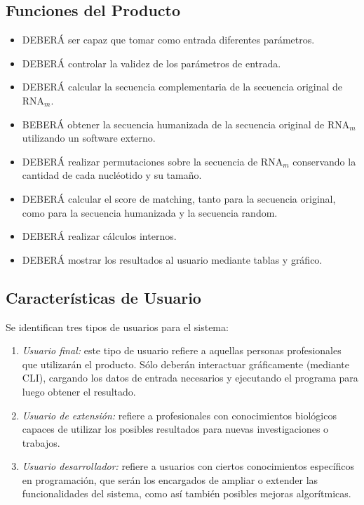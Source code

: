 \documentclass[12pt,a4paper,spanish]{article}
\begin{document}
\subsection{Funciones del Producto}
	\begin{itemize}
		\item DEBERÁ ser capaz que tomar como entrada diferentes parámetros. 
		\item DEBERÁ controlar la validez de los parámetros de entrada.
		\item DEBERÁ calcular la secuencia complementaria de la secuencia original de RNA$_m$.
		\item BEBERÁ obtener la secuencia humanizada de la secuencia original de RNA$_m$ utilizando un software externo.
		\item DEBERÁ realizar permutaciones sobre la secuencia de RNA$_m$ conservando la cantidad de cada nucléotido y su tamaño.
		\item DEBERÁ calcular el score de matching, tanto para la secuencia original, como para la secuencia humanizada y la secuencia random.
		\item DEBERÁ realizar cálculos internos.
		\item DEBERÁ mostrar los resultados al usuario mediante tablas y gráfico.		
	\end{itemize}

\subsection{Características de Usuario}
	Se identifican tres tipos de usuarios para el sistema:
	\begin{enumerate}
 		\item \textit{Usuario final:} este tipo de usuario refiere a aquellas personas profesionales que utilizarán el 										producto. Sólo deberán interactuar gráficamente (mediante CLI), cargando los datos de entrada 										necesarios y ejecutando el programa para luego obtener el resultado. 
		\item \textit{Usuario de extensión:} refiere a profesionales con conocimientos biológicos capaces de utilizar los 												posibles resultados para nuevas investigaciones o trabajos.
		\item \textit{Usuario desarrollador:} refiere a usuarios con ciertos conocimientos específicos en programación, 											que serán los encargados de ampliar o extender las funcionalidades del 												sistema, como así también posibles mejoras algorítmicas.
	\end{enumerate}
\end{document}
